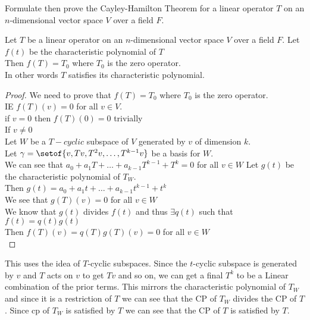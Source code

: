 \documentclass[answers,12pt,addpoints]{exam}
\begin{document}
\begin{questions}
    \question Formulate then prove the Cayley-Hamilton Theorem for a linear operator $T$ on an $n$-dimensional vector space $V$ over a field $F$.\\
    \begin{solution}
        Let $T$ be a linear operator on an $n$-dimensional vector space $V$ over a field $F$. Let $f(t)$ be the characteristic polynomial of $T$ \\
        Then $f(T) = T_0$ where $T_0$ is the zero operator.\\
        In other words $T$ satisfies its characteristic polynomial.\\
        \begin{proof}
            We need to prove that $f(T) = T_0$ where $T_0$ is the zero operator.\\
            IE $f(T)(v) = 0$ for all $v \in V$.\\
            if $v = 0$ then $f(T)(0) = 0$ trivially\\
            If $v \neq 0$ \\
            Let $W$ be a $T-cyclic$ subspace of $V$ generated by $v$ of dimension $k$.\\
            Let $\gamma = \setof{v, Tv, T^2v, \dots, T^{k-1}v}$ be a basis for $W$.\\
            We can see that $a_0 + a_1T + \dots + a_{k-1}T^{k-1} + T^k = 0$ for all $v \in W$ 
            Let $g(t)$ be the characteristic polynomial of $T_W$.\\
            Then $g(t) = a_0 + a_1t + \dots + a_{k-1}t^{k-1} + t^k$\\
            We see that $g(T)(v) = 0$ for all $v \in W$\\
            We know that $g(t)$ divides $f(t)$ and thus $\exists q(t)$ such that $f(t) = q(t)g(t)$\\
            Then $f(T)(v) = q(T)g(T)(v) = 0$ for all $v \in W$\\
        \end{proof}
        This uses the idea of $T$-cyclic subspaces. Since the $t$-cyclic subspace is generated by $v$ and $T$ acts on $v$ to get $Tv$ and so on, we can get a final $T^k$ to be a Linear combination of the prior terms. This mirrors the characteristic polynomial of $T_W$ and since it is a restriction of $T$ we can see that the CP of $T_W$ divides the CP of $T$. Since cp of $T_W$ is satisfied by $T$ we can see that the CP of $T$ is satisfied by $T$.
    \end{solution}
\end{questions}
\end{document}
